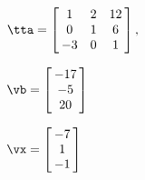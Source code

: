 {$\tta = \left[\hskip -3pt \begin{array}{ccc} 1&2&12\\  0&1&6
\\  -3&0&1\end{array}\hskip -3pt \right],$

$\vb = \left[\hskip -3pt \begin{array}{c} -17\\  -5
\\  20\end{array}\hskip -3pt \right]$ 
}
{$\vx = \left[\hskip -3pt \begin{array}{c} -7\\  1\\  -
1\end{array}\hskip -3pt \right]$}
